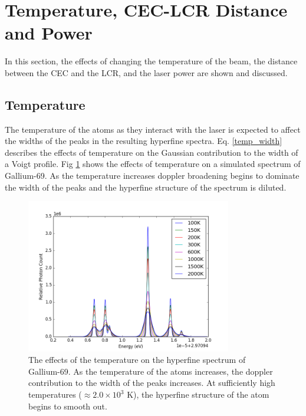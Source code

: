 \section{Temperature, CEC-LCR Distance and Power}
\label{Par_stress}
In this section, the effects of changing the temperature of the beam, the distance between the CEC and the LCR, and  the laser power  are shown and discussed. 

\subsection{Temperature}
The temperature of the atoms as they interact with the laser is expected to affect the widths of the peaks in the resulting hyperfine spectra. Eq. \ref{temp_width} describes the effects of temperature on the Gaussian contribution to the width of a Voigt profile. Fig \ref{temp_comp} shows the effects of temperature on a simulated spectrum of Gallium-69. As the temperature increases doppler broadening begins to dominate the width of the peaks and the hyperfine structure of the spectrum is diluted. 
\begin{figure}[h!]
\begin{center}
\includegraphics[width = 0.8\textwidth]{Graphics/temp_comparison.png}
\end{center}
\caption[The effects of the temperature on the hyperfine spectrum of Gallium-69.]{\small The effects of the temperature on the hyperfine spectrum of Gallium-69. As the temperature of the atoms increases, the doppler contribution to the width of the peaks increases. At sufficiently high temperatures ($\approx 2.0 \times 10^3$ K), the hyperfine structure of the atom begins to smooth out.}
\label{temp_comp}
\end{figure}

